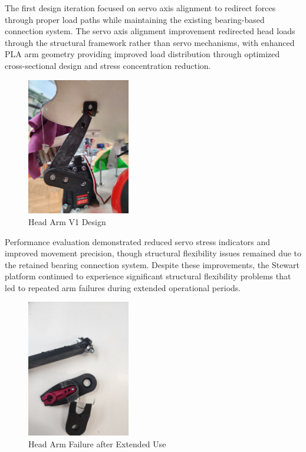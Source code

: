 The first design iteration focused on servo axis alignment to redirect forces through proper load paths while maintaining the existing bearing-based connection system. The servo axis alignment improvement redirected head loads through the structural framework rather than servo mechanisms, with enhanced PLA arm geometry providing improved load distribution through optimized cross-sectional design and stress concentration reduction.

\begin{figure}[H]
    \centering
    \includegraphics[height=6cm, angle=-90]{Images/HeadArmV2.jpg}
    \caption{Head Arm V1 Design}
    \label{fig:head_arm_v1}
\end{figure}

Performance evaluation demonstrated reduced servo stress indicators and improved movement precision, though structural flexibility issues remained due to the retained bearing connection system. Despite these improvements, the Stewart platform continued to experience significant structural flexibility problems that led to repeated arm failures during extended operational periods.

\begin{figure}[H]
    \centering
    \includegraphics[height=6cm, angle=-90]{Images/HeadArmFailure (2).jpg}
    \caption{Head Arm Failure after Extended Use}
    \label{fig:head_arm_failure}
\end{figure}

